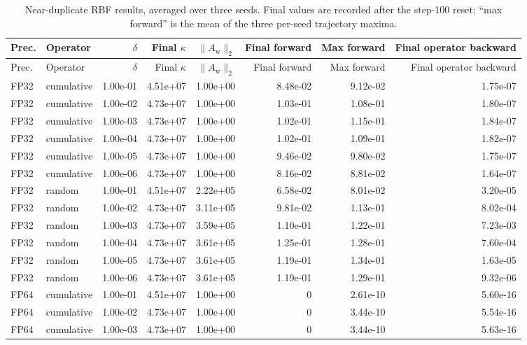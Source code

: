 \documentclass[11pt]{article}
\newcommand{\Aw}{A_{\mathrm w}}
\begin{document}
\begin{landscape}
\scriptsize
\begin{longtable}{@{}llrrrrrr@{}}
\caption{Near-duplicate RBF results, averaged over three seeds.  Final values
are recorded after the step-100 reset; ``max forward'' is the mean of the
three per-seed trajectory maxima.}
\label{tab:e4-kernel}\\
\toprule
Prec. & Operator & \(\delta\) & Final \(\kappa\) & \(\|\Aw\|_2\) &
Final forward & Max forward & Final operator backward \\
\midrule
\endfirsthead
\toprule
Prec. & Operator & \(\delta\) & Final \(\kappa\) & \(\|\Aw\|_2\) &
Final forward & Max forward & Final operator backward \\
\midrule
\endhead
FP32 & cumulative & 1.00e-01 & 4.51e+07 & 1.00e+00 & 8.48e-02 & 9.12e-02 & 1.75e-07 \\
FP32 & cumulative & 1.00e-02 & 4.73e+07 & 1.00e+00 & 1.03e-01 & 1.08e-01 & 1.80e-07 \\
FP32 & cumulative & 1.00e-03 & 4.73e+07 & 1.00e+00 & 1.02e-01 & 1.15e-01 & 1.84e-07 \\
FP32 & cumulative & 1.00e-04 & 4.73e+07 & 1.00e+00 & 1.02e-01 & 1.09e-01 & 1.82e-07 \\
FP32 & cumulative & 1.00e-05 & 4.73e+07 & 1.00e+00 & 9.46e-02 & 9.80e-02 & 1.75e-07 \\
FP32 & cumulative & 1.00e-06 & 4.73e+07 & 1.00e+00 & 8.16e-02 & 8.81e-02 & 1.64e-07 \\
\midrule
FP32 & random & 1.00e-01 & 4.51e+07 & 2.22e+05 & 6.58e-02 & 8.01e-02 & 3.20e-05 \\
FP32 & random & 1.00e-02 & 4.73e+07 & 3.11e+05 & 9.81e-02 & 1.13e-01 & 8.02e-04 \\
FP32 & random & 1.00e-03 & 4.73e+07 & 3.59e+05 & 1.10e-01 & 1.22e-01 & 7.23e-03 \\
FP32 & random & 1.00e-04 & 4.73e+07 & 3.61e+05 & 1.25e-01 & 1.28e-01 & 7.60e-04 \\
FP32 & random & 1.00e-05 & 4.73e+07 & 3.61e+05 & 1.19e-01 & 1.34e-01 & 1.63e-05 \\
FP32 & random & 1.00e-06 & 4.73e+07 & 3.61e+05 & 1.19e-01 & 1.29e-01 & 9.32e-06 \\
\midrule
FP64 & cumulative & 1.00e-01 & 4.51e+07 & 1.00e+00 & 0 & 2.61e-10 & 5.60e-16 \\
FP64 & cumulative & 1.00e-02 & 4.73e+07 & 1.00e+00 & 0 & 3.44e-10 & 5.54e-16 \\
FP64 & cumulative & 1.00e-03 & 4.73e+07 & 1.00e+00 & 0 & 3.44e-10 & 5.63e-16 \\

\end{longtable}
\end{landscape}
\end{document}
